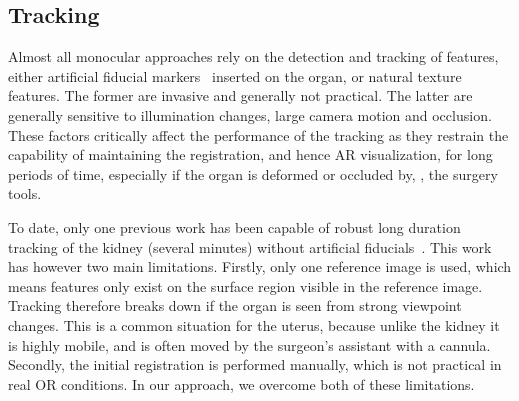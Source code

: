 
\subsection{Tracking}
\label{sec:sotaTracking}
Almost all monocular approaches rely on the detection and tracking of features, either artificial fiducial markers~\cite{Cohen2010Prostate} inserted on the organ, or natural texture features. The former are invasive and generally not practical. The latter are generally sensitive to illumination changes, large camera motion and occlusion. These factors critically affect the performance of the tracking as they restrain the capability of maintaining the registration, and hence AR visualization, for long periods of time, especially if the organ is deformed or occluded by, \eg, the surgery tools. 

To date, only one previous work has been capable of robust long duration tracking of the kidney (several minutes) without artificial fiducials~\cite{affineTracking}. 
This work has however two main limitations. 
Firstly, only one reference image is used, which means features only exist on the surface region visible in the reference image. 
Tracking therefore breaks down if the organ is seen from strong viewpoint changes. This is a common situation for the uterus, because unlike the kidney it is highly mobile, and is often moved by the surgeon's assistant with a cannula. 
Secondly, the initial registration is performed manually, which is not practical in real OR conditions. 
In our approach, we overcome both of these limitations. 



